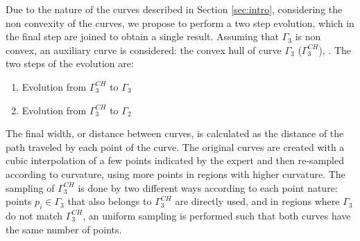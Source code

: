 \documentclass{article}
\begin{document}
Due to the nature of the curves described in Section \ref{sec:intro}, considering the non convexity of the curves, we propose to perform a two step evolution, which in the final step are joined to obtain a single result. Assuming that $\Gamma_3$ is non convex, an auxiliary curve is considered: the convex hull of curve $\Gamma_3$ ($\Gamma_3^{CH}$), \cite{libro}. The two steps of the evolution are:
\begin{enumerate}
  \item Evolution from $\Gamma_3^{CH}$ to $\Gamma_3$
  \item Evolution from $\Gamma_3^{CH}$ to $\Gamma_2$
\end{enumerate}
The final width, or distance between curves, is calculated as the distance of the path traveled by each point of the curve. The original curves are created with a cubic interpolation of a few points indicated by the expert and then re-sampled according to curvature, using more points in regions with higher curvature. The sampling of $\Gamma_3^{CH}$ is done by two different ways according to each point nature: points $p_i\in\Gamma_{3}$ that also belongs to $\Gamma_3^{CH}$ are directly used, and in regions where $\Gamma_3$ do not match $\Gamma_3^{CH}$, an uniform sampling is performed such that both curves have the same number of points.
\end{document}
